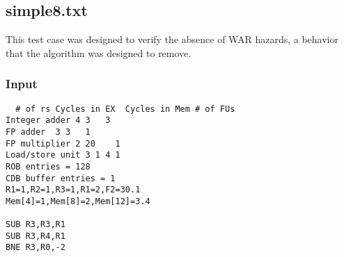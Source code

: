 \documentclass[12pt]{article}
\begin{document}
\subsection{simple8.txt}
This test case was designed to verify the absence of WAR hazards, a behavior that the algorithm was designed to remove.

\subsubsection*{Input}
\begin{verbatim}
  # of rs Cycles in EX  Cycles in Mem # of FUs
Integer adder 4 3   3
FP adder  3 3   1
FP multiplier 2 20    1
Load/store unit 3 1 4 1
ROB entries = 128
CDB buffer entries = 1
R1=1,R2=1,R3=1,R1=2,F2=30.1
Mem[4]=1,Mem[8]=2,Mem[12]=3.4

SUB R3,R3,R1
SUB R3,R4,R1
BNE R3,R0,-2

\end{verbatim}
\end{document}
